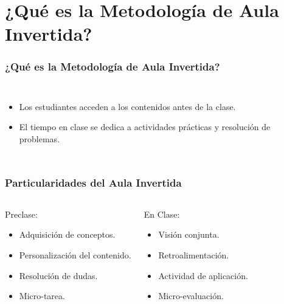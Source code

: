 \section{¿Qué es la Metodología de Aula Invertida?}


\begin{frame}
    \frametitle{¿Qué es la Metodología de Aula Invertida?}
    \vspace{3mm}
    \begin{columns}
    \begin{itemize}[leftmargin=*]
        \item Los estudiantes acceden a los contenidos antes de la clase.
        \item El tiempo en clase se dedica a actividades prácticas y resolución de problemas.
    \end{itemize}
    \end{columns}
\end{frame}


\begin{frame}
    \frametitle{Particularidades del Aula Invertida}
    \begin{columns}
    \begin{block}{Preclase:}
        \begin{itemize}
            \item Adquisición de conceptos.
            \item Personalización del contenido.
            \item Resolución  de dudas.
            \item Micro-tarea.
        \end{itemize}
    \end{block}
    \begin{block}{En Clase:}
        \begin{itemize}
            \item Visión conjunta.
            \item Retroalimentación.
            \item Actividad de aplicación.
            \item Micro-evaluación.
        \end{itemize}
    \end{block}
    \end{columns}
\end{frame}

